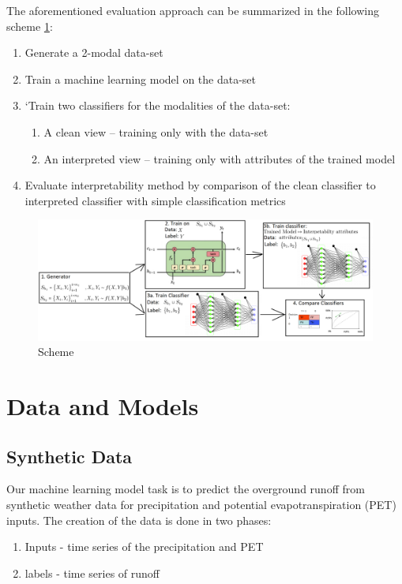 \documentclass[12pt]{report}
\begin{document}
The aforementioned evaluation approach can be summarized in the following scheme \ref{scheme}:
\begin{enumerate}
	\item Generate a 2-modal data-set
	\item Train a machine learning model on the data-set
	\item`Train two classifiers for the modalities of the data-set:
	\begin{enumerate}
		\item A clean view – training only with the data-set
		\item An interpreted view – training only with attributes of the trained model 	
    \end{enumerate}
	\item Evaluate interpretability method by comparison of the clean classifier to interpreted classifier
	with simple classification metrics		
\end{enumerate}
\begin{figure}[H]
	\centering\includegraphics[width=16.4cm]{scheme.png}
	\caption{Scheme}
	\label{scheme}
\end{figure}
\chapter{Data and Models} 

\section{Synthetic Data}

Our machine learning model task is to predict the overground runoff from synthetic weather data for precipitation and potential evapotranspiration (PET) inputs. The creation of the data is done in two phases:

\begin{enumerate}
	\item Inputs - time series of the precipitation and PET
	\item labels - time series of runoff 
\end{enumerate}
 
\end{document}
